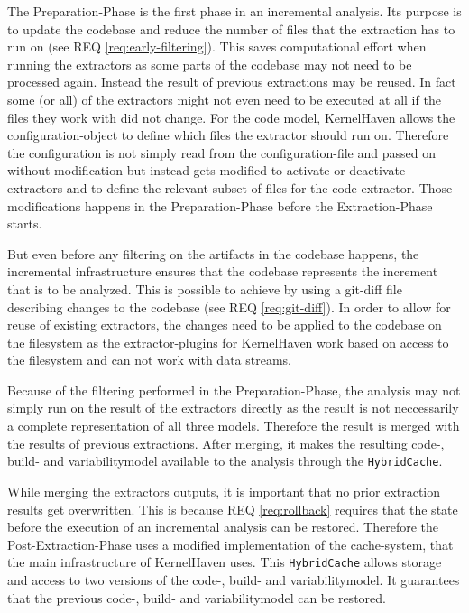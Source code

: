 \documentclass[a4paper]{article}
\begin{document}
The Preparation-Phase is the first phase in an incremental analysis. Its purpose is to update the codebase and reduce the number of files that the extraction has to run on (see REQ \ref{req:early-filtering}). This saves computational effort when running the extractors as some parts of the codebase  may not need to be processed again. Instead the result of previous extractions may be reused. In fact some (or all) of the extractors might not even need to be executed at all if the files they work with did not change. For the code model, KernelHaven allows the configuration-object to define which files the extractor should run on. 
 Therefore the configuration is not simply read from the configuration-file and passed on without modification but instead gets modified to activate or deactivate extractors and to define the relevant subset of files for the code extractor. Those modifications happens in the Preparation-Phase before the Extraction-Phase starts.

 But even before any filtering on the artifacts in the codebase happens, the incremental infrastructure ensures that the codebase represents the increment that is to be analyzed. This is possible to achieve by using a git-diff file describing changes to the codebase (see REQ \ref{req:git-diff}). In order to allow for reuse of existing extractors, the changes need to be applied to the codebase on the filesystem as the extractor-plugins for KernelHaven work based on access to the filesystem and can not work with data streams.

Because of the filtering performed in the Preparation-Phase, the analysis may not simply run on the result of the extractors directly as the result is not neccessarily a complete representation of all three models. Therefore the result is merged with the results of previous extractions. After merging, it makes the resulting code-, build- and variabilitymodel available to the analysis through the \texttt{HybridCache}.

While merging the extractors outputs, it is important that no prior extraction results get overwritten. This is because REQ \ref{req:rollback} requires that the state before the execution of an incremental analysis can be restored. Therefore the Post-Extraction-Phase uses a modified implementation of the cache-system, that the main infrastructure of KernelHaven uses. This \texttt{HybridCache} allows storage and access to two versions of the code-, build- and variabilitymodel. It guarantees that the previous code-, build- and variabilitymodel can be restored.
\end{document}
